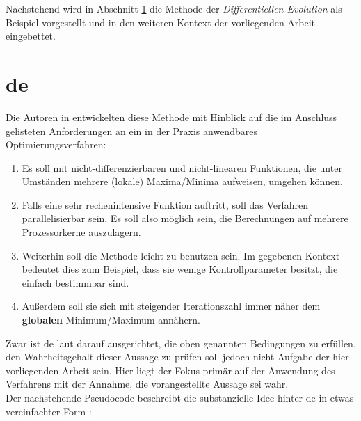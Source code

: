 		Nachstehend wird in Abschnitt \ref{sec:de} die Methode der 
		\textit{Differentiellen Evolution} als Beispiel vorgestellt und in den 
		weiteren Kontext der vorliegenden Arbeit eingebettet.
	

	\section{\gls{de}}
	\label{sec:de}

		Die Autoren in \cite{storn-price-de} entwickelten diese Methode mit Hinblick auf die im Anschluss gelisteten Anforderungen an ein in der Praxis anwendbares Optimierungsverfahren:
		\begin{enumerate}
			\item Es soll mit nicht-differenzierbaren und nicht-linearen 
			Funktionen, die unter Umständen mehrere (lokale) Maxima/Minima 
			aufweisen, umgehen können.
			\item Falls eine sehr rechenintensive Funktion auftritt, soll das 
			Verfahren parallelisierbar sein. Es soll also möglich sein, die 
			Berechnungen auf mehrere Prozessorkerne auszulagern.
			\item Weiterhin soll die Methode leicht zu benutzen sein. Im 
			gegebenen Kontext bedeutet dies zum Beispiel, dass sie wenige 
			Kontrollparameter besitzt, die einfach bestimmbar sind.
			\item Außerdem soll sie sich mit steigender Iterationszahl immer 
			näher dem \textbf{globalen} Minimum/Maximum annähern.
		\end{enumerate}
		Zwar ist \gls{de} laut \cite{storn-price-de} darauf ausgerichtet, die 
		oben genannten Bedingungen zu erfüllen, den Wahrheitsgehalt dieser 
		Aussage zu prüfen soll jedoch nicht Aufgabe der hier vorliegenden 
		Arbeit sein. Hier liegt der Fokus primär auf der Anwendung des 
		Verfahrens mit der Annahme, die vorangestellte Aussage sei wahr.\\
		
		Der nachstehende Pseudocode beschreibt die substanzielle Idee hinter \gls{de} in etwas vereinfachter Form \cite{storn-price-de}:
		
